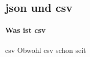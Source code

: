 \subsection{\acs{json} und \acs{csv}}
\paragraph{Was ist \acs{csv}}
\acf{csv}
Obwohl \ac{csv} schon seit 
